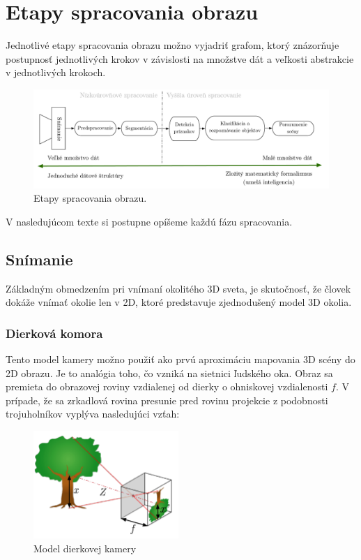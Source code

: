 \section{Etapy spracovania obrazu}

Jednotlivé etapy spracovania obrazu možno vyjadriť grafom, ktorý znázorňuje postupnosť jednotlivých krokov v závislosti na množstve dát a veľkosti abstrakcie v jednotlivých krokoch. \cite{Analysis_and_Machine_Vision} 

\begin{figure}[H]
\begin{center}
	\includegraphics[scale=0.45]{images/phaseCV}
	\caption{Etapy spracovania obrazu.}
	\end{center}
\end{figure}

V nasledujúcom texte si postupne opíšeme každú fázu spracovania. 


\subsection{Snímanie}
Základným obmedzením pri vnímaní okolitého 3D sveta, je skutočnosť, že človek dokáže vnímať okolie len v 2D, ktoré predstavuje zjednodušený model 3D okolia.


\subsubsection{Dierková komora} Tento model kamery možno použiť ako prvú aproximáciu mapovania 3D scény do 2D obrazu. Je to analógia toho, čo vzniká na sietnici ľudského oka. Obraz sa premieta do obrazovej roviny vzdialenej od dierky o ohniskovej vzdialenosti $f$. V prípade, že sa zrkadlová rovina presunie pred rovinu projekcie z podobnosti trojuholníkov vyplýva nasledujúci vzťah:\cite{Pin_hole_camera}\cite{pocitacove_videnie_v_praxi}



\begin{figure}[H]
\begin{center}
	\includegraphics[width=5.5cm]{images/holeCamera}
	\caption{Model dierkovej kamery}
	\end{center}
\end{figure}

